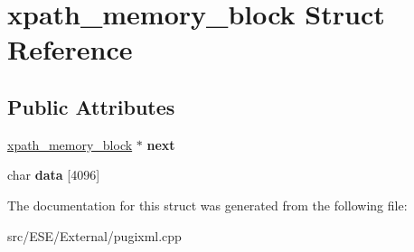 \hypertarget{structxpath__memory__block}{\section{xpath\-\_\-memory\-\_\-block Struct Reference}
\label{structxpath__memory__block}
}
\subsection*{Public Attributes}
\begin{DoxyCompactItemize}
\item 
\hypertarget{structxpath__memory__block_ab7f0d8400b40a51cdb063e76fd19a93c}{\hyperlink{structxpath__memory__block}{xpath\-\_\-memory\-\_\-block} $\ast$ {\bfseries next}}\label{structxpath__memory__block_ab7f0d8400b40a51cdb063e76fd19a93c}

\item 
\hypertarget{structxpath__memory__block_a7b00376d0eac172ab537b6b0964858a9}{char {\bfseries data} \mbox{[}4096\mbox{]}}\label{structxpath__memory__block_a7b00376d0eac172ab537b6b0964858a9}

\end{DoxyCompactItemize}


The documentation for this struct was generated from the following file\-:\begin{DoxyCompactItemize}
\item 
src/\-E\-S\-E/\-External/pugixml.\-cpp\end{DoxyCompactItemize}
